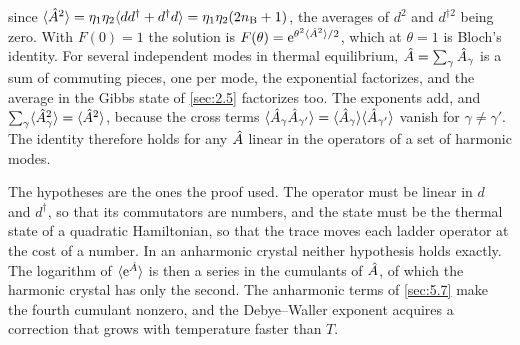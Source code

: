 since $\langle\hat{A}^2\rangle = \eta_1\eta_2\langle dd^\dagger + d^\dagger d\rangle = \eta_1\eta_2(2n_{\mathrm{B}} + 1)$, the averages of $d^2$ and $d^{\dagger2}$ being zero. With $F(0) = 1$ the solution is $F(\theta) = \mathrm{e}^{\theta^2\langle\hat{A}^2\rangle/2}$, which at $\theta = 1$ is Bloch's identity. For several independent modes in thermal equilibrium, $\hat{A} = \sum_\gamma\hat{A}_\gamma$ is a sum of commuting pieces, one per mode, the exponential factorizes, and the average in the Gibbs state of \cref{sec:2.5} factorizes too. The exponents add, and $\sum_\gamma\langle\hat{A}_\gamma^2\rangle = \langle\hat{A}^2\rangle$, because the cross terms $\langle\hat{A}_\gamma\hat{A}_{\gamma'}\rangle = \langle\hat{A}_\gamma\rangle\langle\hat{A}_{\gamma'}\rangle$ vanish for $\gamma \ne \gamma'$. The identity therefore holds for any $\hat{A}$ linear in the operators of a set of harmonic modes.

The hypotheses are the ones the proof used. The operator must be linear in $d$ and $d^\dagger$, so that its commutators are numbers, and the state must be the thermal state of a quadratic Hamiltonian, so that the trace moves each ladder operator at the cost of a number. In an anharmonic crystal neither hypothesis holds exactly. The logarithm of $\langle\mathrm{e}^{\hat{A}}\rangle$ is then a series in the cumulants of $\hat{A}$, of which the harmonic crystal has only the second. The anharmonic terms of \cref{sec:5.7} make the fourth cumulant nonzero, and the Debye--Waller exponent acquires a correction that grows with temperature faster than $T$.

